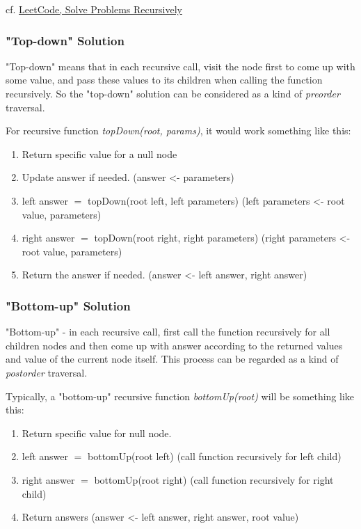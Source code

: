 \documentclass[10pt]{amsart}
\begin{document}
\begin{multicols*}{2}
cf. \href{https://leetcode.com/explore/learn/card/data-structure-tree/17/solve-problems-recursively/534/}{LeetCode, Solve Problems Recursively}

\subsubsection{"Top-down" Solution}

"Top-down" means that in each recursive call, visit the node first to come up with some value, and pass these values to its children when calling the function recursively. So the "top-down" solution can be considered as a kind of \emph{preorder} traversal.

For recursive function \emph{topDown(root, params)}, it would work something like this:

\begin{enumerate}
	\item Return specific value for a null node
	\item Update answer if needed. (answer <- parameters)
	\item left answer $=$ topDown(root left, left parameters) (left parameters <- root value, parameters)
	\item right answer $=$ topDown(root right, right parameters) (right parameters <- root value, parameters)
	\item Return the answer if needed. (answer <- left answer, right answer)
\end{enumerate}

\subsubsection{"Bottom-up" Solution}

"Bottom-up" - in each recursive call, first call the function recursively for all children nodes and then come up with answer according to the returned values and value of the current node itself. This process can be regarded as a kind of \emph{postorder} traversal.

Typically, a "bottom-up" recursive function \emph{bottomUp(root)} will be something like this:

\begin{enumerate}
	\item Return specific value for null node.
	\item left answer $=$ bottomUp(root left) (call function recursively for left child)
	\item right answer $=$ bottomUp(root right) (call function recursively for right child)
	\item Return answers (answer <- left answer, right answer, root value)
\end{enumerate}


\end{multicols*}
\end{document}
